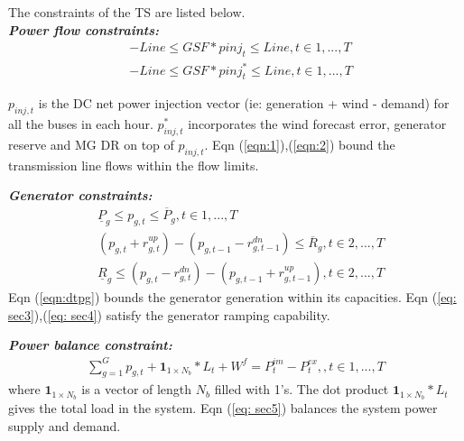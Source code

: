 The constraints of the TS are listed below. \\
\textbf{\emph{Power flow constraints:} }
\begin{align}
&-Line\leq GSF*pinj_{t}\leq Line, t\in{1,...,T}\label{eqn:1}\\
&-Line\leq GSF*pinj_{t}^*\leq Line, t\in{1,...,T}\label{eqn:2}
\end{align}

$p_{inj,t}$ is the DC net power injection vector (ie: generation + wind - demand) for all the buses in each hour. $p_{inj,t}^*$ incorporates the wind forecast error, generator reserve and MG DR on top of $p_{inj,t}$. Eqn (\ref{eqn:1}),(\ref{eqn:2})  bound the transmission line flows within the flow limits. 
 
\textbf{\emph{Generator constraints:} }
\begin{align}
& \underline{P}_g\leq p_{g,t}\leq  \overline{P}_g,  t\in{1,...,T}\label{eqn:dtpg}\\
& (p_{g,t} +r_{g,t}^{up})  - (p_{g,t-1}-  r_{g,t-1}^{dn}) \leq \overline{R}_g ,  t\in{2,...,T}\label{eq: sec3} \\
&  \underline{R}_{g} \leq (p_{g,t} -  r_{g,t}^{dn})  - (p_{g,t-1}+ r_{g,t-1}^{up}) , t\in{2,...,T}\label{eq: sec4} 
\end{align}
Eqn (\ref{eqn:dtpg}) bounds the generator generation within its capacities. Eqn (\ref{eq: sec3}),(\ref{eq: sec4}) satisfy the generator ramping capability. 

\textbf{\emph{Power balance constraint:} }
\begin{align}
\sum_{g=1}^{G} p_{g,t} + \mathbf{1}_{1\times N_b}*L_{t} + W^f = P^{im}_t-P^{ex}_t, ,  t\in{1,...,T}\label{eq: sec5} 
\end{align}
where $\mathbf{1}_{1\times N_b}$ is a vector of length $N_b$ filled with 1's. The dot product $\mathbf{1}_{1\times N_b}*L_{t}$ gives the total load in the system. Eqn (\ref{eq: sec5}) balances the system power supply and demand. 

